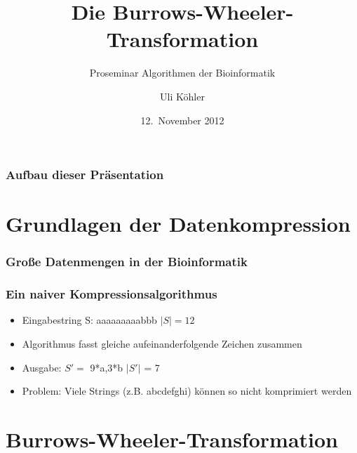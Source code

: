\documentclass[14pt,xcolor=dvipsnames]{beamer}
\title{Die Burrows-Wheeler-Transformation}
\subtitle{Proseminar \glqq Algorithmen der Bioinformatik\grqq}
\author{Uli Köhler}
\date{12.~November 2012}
\begin{document}
\frame{\titlepage}
\begin{frame}
\frametitle{Aufbau dieser Präsentation}
\tableofcontents
\end{frame}

\section{Grundlagen der Datenkompression}
\begin{frame}
\frametitle{Große Datenmengen in der Bioinformatik}
  
\end{frame}
\begin{frame}[allowframebreaks]
\frametitle{Ein naiver Kompressionsalgorithmus}
\begin{itemize}
 \item Eingabestring S: aaaaaaaaabbb \textrightarrow $|S| = 12$
 \item Algorithmus fasst gleiche aufeinanderfolgende Zeichen zusammen
 \item Ausgabe: $S' = $ 9*a,3*b \textrightarrow $|S'|$ = 7
 \item Problem: Viele Strings (z.B. abcdefghi) können so nicht komprimiert werden
\end{itemize}
\end{frame}
\section{Burrows-Wheeler-Transformation}
\end{document}
